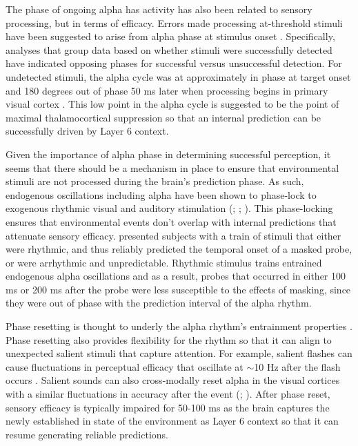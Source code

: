 \documentclass[dwyatte_dissertation.tex]{subfiles}
\begin{document}
The phase of ongoing alpha has activity has also been related to sensory processing, but in terms of efficacy. Errors made processing at-threshold stimuli have been suggested to arise from alpha phase at stimulus onset \cite{MathewsonGrattonFabianiEtAl09,BuschDuboisVanRullen09}. Specifically, analyses that group data based on whether stimuli were successfully detected have indicated opposing phases for successful versus unsuccessful detection. For undetected stimuli, the alpha cycle was at approximately in phase at target onset and 180 degrees out of phase 50 ms later when processing begins in primary visual cortex \cite{NowakBullier97,FoxeSimpson02}. This low point in the alpha cycle is suggested to be the point of maximal thalamocortical suppression  so that an internal prediction can be successfully driven by Layer 6 context. 

Given the importance of alpha phase in determining successful perception, it seems that there should be a mechanism in place to ensure that environmental stimuli are not processed during the brain's prediction phase. As such, endogenous oscillations including alpha have been shown to phase-lock to exogenous rhythmic visual and auditory stimulation (; ; ). This phase-locking ensures that environmental events don't overlap with internal predictions that attenuate sensory efficacy.  presented subjects with a train of stimuli that either were rhythmic, and thus reliably predicted the temporal onset of a masked probe, or were arrhythmic and unpredictable. Rhythmic stimulus trains entrained endogenous alpha oscillations and as a result, probes that occurred in either 100 ms or 200 ms after the probe were less susceptible to the effects of masking, since they were out of phase with the prediction interval of the alpha rhythm.

Phase resetting is thought to underly the alpha rhythm's entrainment properties \cite{CalderoneLakatosButlerEtAl14}. Phase resetting also provides flexibility for the rhythm  so that it can align to unexpected salient stimuli that capture attention. For example, salient flashes can cause fluctuations in perceptual efficacy that oscillate at $\sim$10 Hz after the flash occurs \cite{LandauFries12}. Salient sounds can also cross-modally reset alpha in the visual cortices with a similar fluctuations in accuracy after the event (; ). After phase reset, sensory efficacy is typically impaired for 50-100 ms as the brain captures the newly established in state of the environment as Layer 6 context so that it can resume generating reliable predictions.
\end{document}
